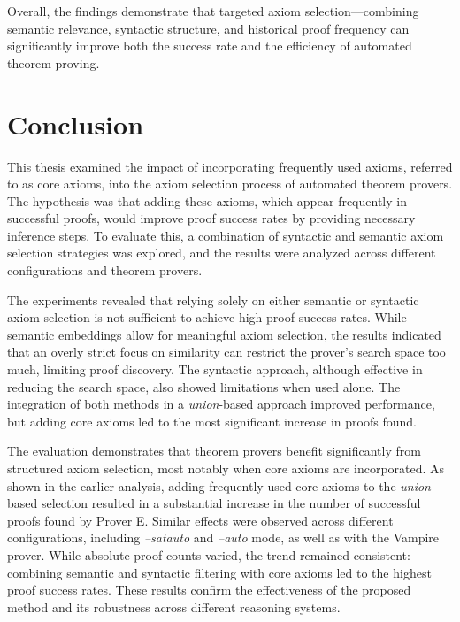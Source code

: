 \documentclass[english,version-2020-11]{uzl-thesis}
\begin{document}
Overall, the findings demonstrate that targeted axiom selection—combining semantic relevance, syntactic structure, and historical proof frequency can significantly improve both the success rate and the efficiency of automated theorem proving.




\chapter{Conclusion}
\label{chapter-conclusion}
This thesis examined the impact of incorporating frequently used axioms, referred to as core axioms, into the axiom selection process of automated theorem provers. The hypothesis was that adding these axioms, which appear frequently in successful proofs, would improve proof success rates by providing necessary inference steps. To evaluate this, a combination of syntactic and semantic axiom selection strategies was explored, and the results were analyzed across different configurations and theorem provers.

The experiments revealed that relying solely on either semantic or syntactic axiom selection is not sufficient to achieve high proof success rates. While semantic embeddings allow for meaningful axiom selection, the results indicated that an overly strict focus on similarity can restrict the prover’s search space too much, limiting proof discovery. The syntactic approach, although effective in reducing the search space, also showed limitations when used alone. The integration of both methods in a \textit{union}-based approach improved performance, but adding core axioms led to the most significant increase in proofs found.

The evaluation demonstrates that theorem provers benefit significantly from structured axiom selection, most notably when core axioms are incorporated. As shown in the earlier analysis, adding frequently used core axioms to the \textit{union}-based selection resulted in a substantial increase in the number of successful proofs found by Prover E. Similar effects were observed across different configurations, including \textit{--satauto} and \textit{--auto} mode, as well as with the Vampire prover. While absolute proof counts varied, the trend remained consistent: combining semantic and syntactic filtering with core axioms led to the highest proof success rates. These results confirm the effectiveness of the proposed method and its robustness across different reasoning systems.
\end{document}
